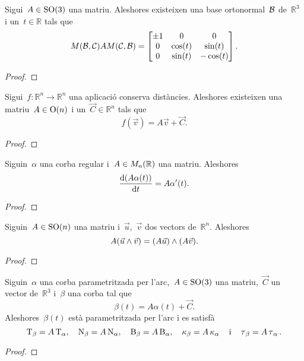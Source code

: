 \documentclass[../../Main.tex]{subfiles}
\begin{document}
	\begin{proposition}
		Sigui~\(A\in\operatorname{SO}(3)\) una matriu.
		Aleshores existeixen una base ortonormal~\(\mathcal{B}\) de~\(\mathbb{R}^{3}\) i un~\(t\in\mathbb{R}\) tals que
		\[M(\mathcal{B},\mathcal{C})AM(\mathcal{C},\mathcal{B})=\begin{bmatrix}
			\pm1 & 0 & 0 \\
			0 & \cos(t) & \sin(t) \\
			0 & \sin(t) & -\cos(t)
		\end{bmatrix}.\]
		\begin{proof}
		\end{proof}
	\end{proposition}
	\begin{proposition}
		\label{prop:forma matricial de les aplicacions que conserven distàncies}
		Sigui~\(f\colon\mathbb{R}^{n}\longrightarrow\mathbb{R}^{n}\) una aplicació conserva distàncies.
		Aleshores existeixen una matriu~\(A\in\operatorname{O}(n)\) i un~\(\vec{C}\in\mathbb{R}^{n}\) tals que
		\[
		    f(\vec{v})=A\vec{v}+\vec{C}.
		\]
		\begin{proof}
		\end{proof}
	\end{proposition}
	\begin{proposition}
		\label{prop:derivada del producte d'una matriu per una corba}
		Siguin~\(\alpha\) una corba regular i~\(A\in M_{n}(\mathbb{R})\) una matriu.
		Aleshores
		\[
		    \frac{\mathop{}\!\mathrm{d}(A\alpha(t))}{\mathop{}\!\mathrm{d} t}=A\alpha'(t).
		\]
		\begin{proof}
		\end{proof}
	\end{proposition}
	\begin{proposition}
		\label{prop:les matrius especials ortogonals conserven el producte vectorial}
		Siguin~\(A\in\operatorname{SO}(n)\) una matriu i~\(\vec{u}\),~\(\vec{v}\) dos vectors de~\(\mathbb{R}^{n}\).
		Aleshores
		\[
		    A(\vec{u}\mathbin{\wedge}\vec{v})=(A\vec{u})\mathbin{\wedge}(A\vec{v}).
		\]
		\begin{proof}
		\end{proof}
	\end{proposition}
	\begin{corollary}
		\label{cor:una corba parametritzada per l'arc i la seva imatge per una aplicació que conserva les distàncies són equivalents}
		Siguin~\(\alpha\) una corba parametritzada per l'arc,~\(A\in\operatorname{SO}(3)\) una matriu,~\(\vec{C}\) un vector de~\(\mathbb{R}^{3}\) i~\(\beta\) una corba tal que
		\[
		    \beta(t)=A\alpha(t)+\vec{C}.
		\]
		Aleshores~\(\beta(t)\) està parametritzada per l'arc i es satisfà
		\[
		    \operatorname{T}_{\beta}=A\operatorname{T}_{\alpha},\quad\operatorname{N}_{\beta}=A\operatorname{N}_{\alpha},\quad\operatorname{B}_{\beta}=A\operatorname{B}_{\alpha},\quad\operatorname{\kappa}_{\beta}=A\operatorname{\kappa}_{\alpha}\quad\text{i}\quad\operatorname{\tau}_{\beta}=A\operatorname{\tau}_{\alpha}.
		\]
		\begin{proof}
		\end{proof}
	\end{corollary}
\end{document}

